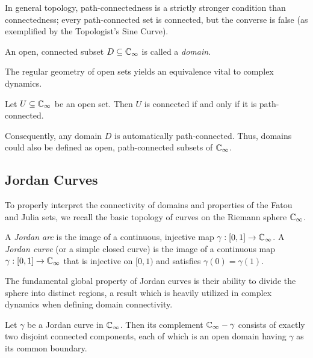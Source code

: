 In general topology, path-connectedness is a strictly stronger condition than
connectedness; every path-connected set is connected, but the converse is false
(as exemplified by the Topologist's Sine Curve).

\begin{definition*}[Domain]
    An open, connected subset $D \subseteq \mathbb{C}_\infty$ is called a \emph{domain}.
\end{definition*}

The regular geometry of open sets yields an equivalence vital to complex
dynamics.

\begin{theorem*}
    Let $U \subseteq \mathbb{C}_\infty$ be an open set. Then $U$ is connected if and only if
    it is path-connected.
\end{theorem*}

Consequently, any domain $D$ is automatically path-connected. Thus, domains
could also be defined as open, path-connected subsets of $\mathbb{C}_\infty$.

\subsection*{Jordan Curves}

To properly interpret the connectivity of domains and properties of the Fatou
and Julia sets, we recall the basic topology of curves on the Riemann sphere
$\mathbb{C}_\infty$.

\begin{definition*}
    A \emph{Jordan arc} is the image of a continuous, injective map $\gamma: [0,
    1] \to \mathbb{C}_\infty$. A \emph{Jordan curve} (or a simple closed curve) is the image
    of a continuous map $\gamma: [0, 1] \to \mathbb{C}_\infty$ that is injective on $[0, 1)$
    and satisfies $\gamma(0) = \gamma(1)$.
\end{definition*}

The fundamental global property of Jordan curves is their ability to divide the
sphere into distinct regions, a result which is heavily utilized in complex
dynamics when defining domain connectivity.

\begin{theorem*}
    Let $\gamma$ be a Jordan curve in $\mathbb{C}_\infty$. Then its complement $\mathbb{C}_\infty -
    \gamma$ consists of exactly two disjoint connected components, each of which
    is an open domain having $\gamma$ as its common boundary.
\end{theorem*}

